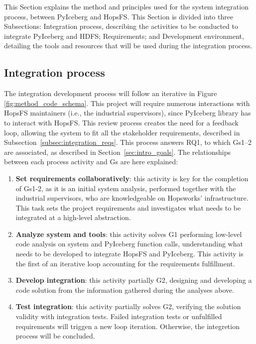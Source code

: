 This Section explains the method and principles used for the system integration process, between PyIceberg and \gls{HopsFS}. This Section is divided into three Subsections: Integration process, describing the activities to be conducted to integrate PyIceberg and \gls{HDFS}; Requirements; and Development environment, detailing the tools and resources that will be used during the integration process.


\subsection{Integration process}
\label{subsec:integration_process}
The integration development process will follow an iterative in Figure \ref{fig:method_code_schema}. This project will require numerous interactions with \gls{HopsFS} maintainers (i.e., the industrial supervisors), since PyIceberg library has to interact with \gls{HopsFS}. This review process creates the need for a feedback loop, allowing the system to fit all the stakeholder requirements, described in Subsection~\ref{subsec:integration_reqs}. This process answers \gls{RQ}1, to which \glspl{G}1--2 are associated, as described in Section~\ref{sec:intro_goals}. The relationships between each process activity and \glspl{G} are here explained:

\begin{enumerate}
    \item \textbf{Set requirements collaboratively}: this activity is key for the completion of \glspl{G}1-2, as it is an initial system analysis, performed together with the industrial supervisors, who are knowledgeable on Hopsworks' infrastructure. This task sets the project requirements and investigates what needs to be integrated at a high-level abstraction.
    \item \textbf{Analyze system and tools}: this activity solves \gls{G}1 performing low-level code analysis on system and PyIceberg function calls, understanding what needs to be developed to integrate \gls{HopsFS} and PyIceberg. This activity is the first of an iterative loop accounting for the requirements fulfillment.
    \item \textbf{Develop integration}: this activity partially \gls{G}2, designing and developing a code solution from the information gathered during the analyses above.
    \item \textbf{Test integration}: this activity partially solves \gls{G}2, verifying the solution validity with integration tests. Failed integration tests or unfulfilled requirements will triggen a new loop iteration. Otherwise, the integretion process will be concluded.
\end{enumerate}

